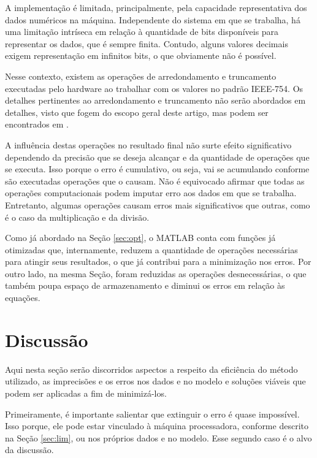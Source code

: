 	A implementação é limitada, principalmente, pela capacidade representativa dos dados numéricos na máquina.
	Independente do sistema em que se trabalha, há uma limitação intríseca em relação à quantidade de bits disponíveis
	para representar os dados, que é sempre finita. Contudo, alguns valores decimais exigem representação em infinitos
	bits, o que obviamente não é possível.

	Nesse contexto, existem as operações de arredondamento e truncamento executadas pelo hardware ao trabalhar com
	os valores no padrão IEEE-754. Os detalhes pertinentes ao arredondamento e truncamento não serão abordados em detalhes,
	visto que fogem do escopo geral deste artigo, mas podem ser encontrados em \cite{polidorio:ieee}.

	A influência destas operações no resultado final não surte efeito significativo dependendo da precisão que se deseja
	alcançar e da quantidade de operações que se executa. Isso porque o erro é cumulativo, ou seja, vai se acumulando conforme
	são executadas operações que o causam. Não é equivocado afirmar que todas as operações computacionais podem imputar erro
	aos dados em que se trabalha. Entretanto, algumas operações causam erros mais significativos que outras, como é o caso da
	multiplicação e da divisão.

	Como já abordado na Seção \ref{sec:opt}, o MATLAB conta com funções já otimizadas que, internamente, reduzem a quantidade de operações
	necessárias para atingir seus resultados, o que já contribui para a minimização nos erros. Por outro lado, na mesma Seção, foram
	reduzidas as operações desnecessárias, o que também poupa espaço de armazenamento e diminui os erros em relação às equações.

	\section{Discussão}
	\label{sec:discussao}
	Aqui nesta seção serão discorridos aspectos a respeito da eficiência do método utilizado, as imprecisões e os erros
	nos dados e no modelo e soluções viáveis que podem ser aplicadas a fim de minimizá-los.

	Primeiramente, é importante salientar que extinguir o erro é quase impossível. Isso porque, ele pode estar vinculado
	à máquina processadora, conforme descrito na Seção \ref{sec:lim}, ou nos próprios dados e no modelo. Esse segundo caso é o alvo
	da discussão.


